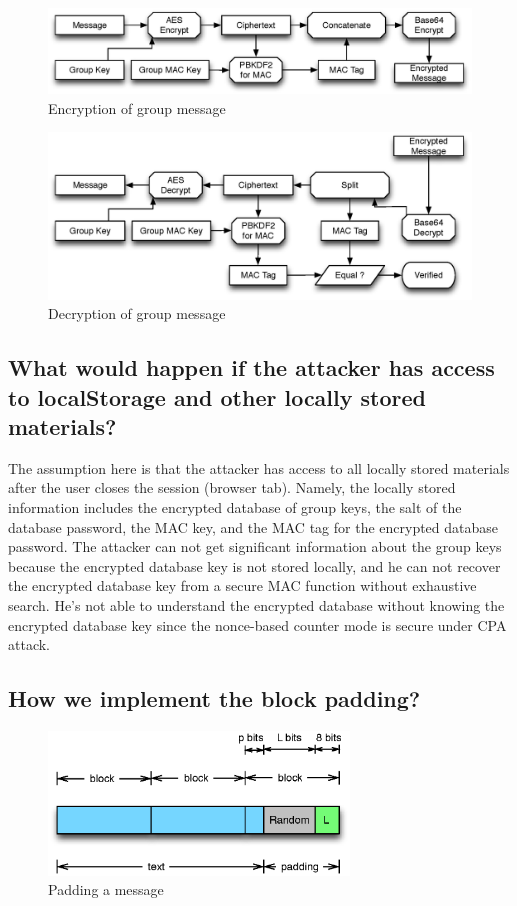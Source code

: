 \begin{figure}[h!]
\centering
\caption{Encryption of group message}
\label{fig:msg_enc}
\includegraphics[width=12cm]{fig/msg_enc.eps}
\end{figure}
\begin{figure}[h!]
\centering
\caption{Decryption of group message}
\label{fig:msg_dec}
\includegraphics[width=12cm]{fig/msg_dec.eps}
\end{figure}

\subsection{What would happen if the attacker has access to localStorage and other locally stored materials? }
The assumption here is that the attacker has access to all locally stored materials after the user closes the session (browser tab). Namely, the locally stored information includes the encrypted database of  group keys, the salt of the database password, the MAC key, and the MAC tag for the encrypted database password. The attacker can not get significant information about the group keys because the encrypted database key is not stored locally, and he can not recover the encrypted database key from a secure MAC function without exhaustive search. He's not able to understand the encrypted database without knowing the encrypted database key since the nonce-based counter mode is secure under CPA attack. 
\subsection{How we implement the block padding?}

\begin{figure}[h!]
\centering
\caption{Padding a message}
\label{fig:padding}
\includegraphics[width=8cm]{fig/padding.eps}
\end{figure}

